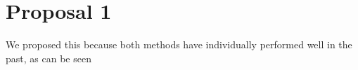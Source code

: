 \section{Proposal 1}\label{section:proposal_1}

We proposed this because both methods have individually performed well in the past, as can be seen 